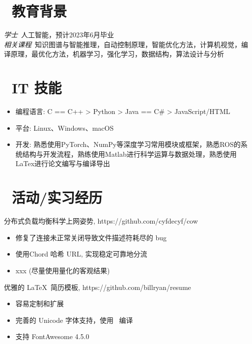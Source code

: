 \documentclass{resume}
\begin{document}

 
\section{\faGraduationCap\  教育背景}
\textit{学士}\ 人工智能，预计2023年6月毕业\\
\textit{相关课程}\  知识图谱与智能推理，自动控制原理，智能优化方法，计算机视觉，编译原理，最优化方法，机器学习，强化学习，数据结构，算法设计与分析

\section{\faCogs\ IT 技能}
\begin{itemize}[parsep=0.5ex]
  \item 编程语言: C == C++ > Python > Java == C\# > JavaScript/HTML
  \item 平台: Linux、Windows、macOS
  \item 开发: 熟悉使用PyTorch、NumPy等深度学习常用模块或框架，熟悉ROS的系统结构与开发流程，熟练使用Matlab进行科学运算与数据处理，熟悉使用LaTex进行论文编写与编译导出
\end{itemize}

\section{\faUsers\ 活动/实习经历}
\begin{onehalfspacing}
分布式负载均衡科学上网姿势, https://github.com/cyfdecyf/cow
\begin{itemize}
  \item 修复了连接未正常关闭导致文件描述符耗尽的 bug
  \item 使用Chord 哈希 URL, 实现稳定可靠地分流
  \item xxx (尽量使用量化的客观结果)
\end{itemize}
\end{onehalfspacing}

\begin{onehalfspacing}
优雅的 \LaTeX\ 简历模板, https://github.com/billryan/resume
\begin{itemize}
  \item 容易定制和扩展
  \item 完善的 Unicode 字体支持，使用 \XeLaTeX\ 编译
  \item 支持 FontAwesome 4.5.0
\end{itemize}
\end{onehalfspacing}
\end{document}
